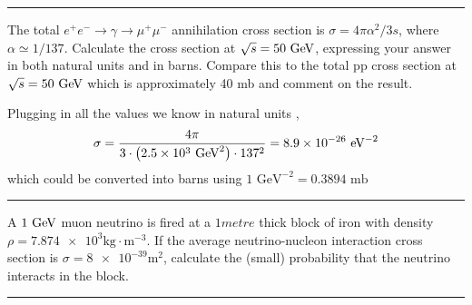 \noindent\rule{7in}{1.5pt}


\begin{problem}{3.5}
The total $e^+e^-\to\gamma\to\mu^+\mu^-$ annihilation cross section is $\sigma = 4\pi\alpha^2/3s$, where $\alpha \simeq 1/137$. 
Calculate the cross section at $\sqrt{s}=50\text{ GeV}$, expressing your answer in both natural units and in barns.
Compare this to the total pp cross section at $\sqrt{s}=50\text{ GeV}$ which is approximately 40 mb and comment on the result.
\end{problem}
\begin{solution}
Plugging in all the values we know in natural units ,
\begin{align*}
    \sigma = \frac{4\pi}{3\cdot \left( \num{2.5e3} \text{ GeV}^2 \right)\cdot 137^2} = \num{8.9e-26} \text{ eV}^{-2}
\end{align*}
which could be converted into barns using $1\text{ GeV}^{-2} = 0.3894 \text{ mb}$
\end{solution} 
    
\noindent\rule{7in}{1.5pt}
    


\begin{problem}{3.6}
A $1\text{ GeV}$ muon neutrino is fired at a $1\unit{metre}$ thick block of iron with density $\rho=\num{7.874e3}\unit{\kilo\gram\cdot\metre^{-3}}$.
If the average neutrino-nucleon interaction cross section is $\sigma=\num{8e-39}\unit{\square\metre}$, calculate the (small) probability that the neutrino interacts in the block.
\end{problem}
            
\begin{solution}
        
            
\end{solution} 
    
\noindent\rule{7in}{1.5pt}
    


\begin{problem}{3.7}

\end{problem}
            

